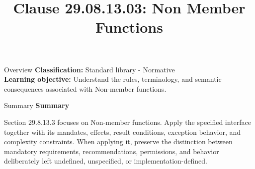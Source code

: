 \documentclass[10pt,letterpaper]{article}
\title{Clause 29.08.13.03: Non Member Functions}
\author{}
\date{}
\begin{document}
\maketitle
\begin{CornellOverviewBox}{Overview}
\textbf{Classification:} Standard library - Normative\\[2pt]
\textbf{Learning objective:} Understand the rules, terminology, and semantic consequences associated with Non-member functions.
\end{CornellOverviewBox}\begin{CornellSummaryBox}{Summary}
{\sffamily\bfseries\color{Accent} Summary}\par\vspace{3pt}Section 29.8.13.3 focuses on Non-member functions. Apply the specified interface together with its mandates, effects, result conditions, exception behavior, and complexity constraints. When applying it, preserve the distinction between mandatory requirements, recommendations, permissions, and behavior deliberately left undefined, unspecified, or implementation-defined.
\end{CornellSummaryBox}
\end{document}
